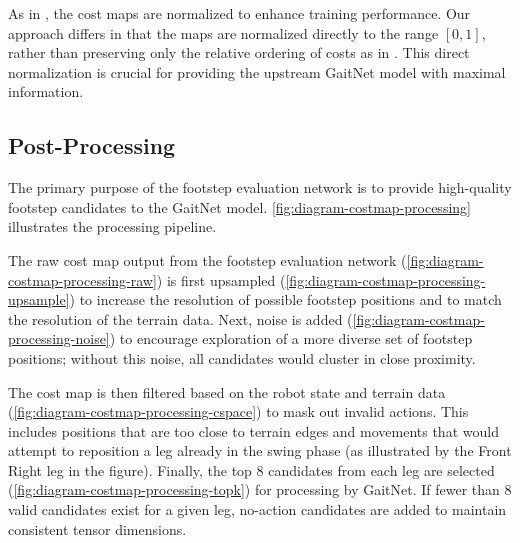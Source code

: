 As in \cite{bratta_contactnet_2024}, the cost maps are normalized to
enhance training performance. Our approach differs in that the maps
are normalized directly to the range $[0, 1]$, rather than preserving
only the relative ordering of costs as in
\cite{bratta_contactnet_2024}. This direct normalization is crucial
for providing the upstream GaitNet model with maximal information.

\subsection{Post-Processing}
\label{subsec:contactnet-post-processing}

The primary purpose of the footstep evaluation network is to provide
high-quality footstep candidates to the GaitNet model.
\autoref{fig:diagram-costmap-processing} illustrates the processing pipeline.

The raw cost map output from the footstep evaluation network
(\autoref{fig:diagram-costmap-processing-raw}) is first upsampled
(\autoref{fig:diagram-costmap-processing-upsample}) to increase the
resolution of possible footstep positions and to match the resolution
of the terrain data. Next, noise is added
(\autoref{fig:diagram-costmap-processing-noise}) to encourage
exploration of a more diverse set of footstep positions; without this
noise, all candidates would cluster in close proximity.

The cost map is then filtered based on the robot state and terrain
data (\autoref{fig:diagram-costmap-processing-cspace}) to mask out
invalid actions. This includes positions that are too close to
terrain edges and movements that would attempt to reposition a leg
already in the swing phase (as illustrated by the Front Right leg in
the figure). Finally, the top 8 candidates from each leg are selected
(\autoref{fig:diagram-costmap-processing-topk}) for processing by
GaitNet. If fewer than 8 valid candidates exist for a given leg,
no-action candidates are added to maintain consistent tensor dimensions.

\def\imgwidth{0.16\textwidth}
\def\xgap{2em}          %
\def\arrowwidth{1.2em}  %
\def\arrowshift{0.5em} %

